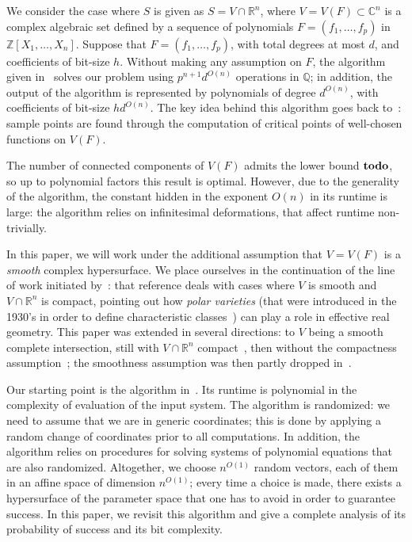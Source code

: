 \documentclass[a4paper]{article}
\newcommand{\ZZ}{{\mathbb{Z}}}
\def\C{\mathbb{C}}
\def\Q{\mathbb{Q}}
\def\R{\mathbb{R}}
\def\td{{\bf todo}}
\begin{document}
We consider the case where $S$ is given as $S=V \cap
\R^n$, where $V=V(F) \subset \C^n$ is a complex algebraic set defined
by a sequence of polynomials $F = (f_1,\hdots,f_p)$ in $\ZZ[X_1,\dots,X_n]$. Suppose that $F = (f_1,\hdots,f_p)$, with total degrees at most $d$, and coefficients of bit-size $h$. Without making any assumption on $F$, the algorithm given
in~\cite[Section~13.1]{BaPoRo03} solves our problem using $p^{n+1}d^{O(n)}$
operations in $\Q$; in addition, the output of the algorithm is
represented by polynomials of degree $d^{O(n)}$, with coefficients of
bit-size $hd^{O(n)}$.  The key idea behind this algorithm goes back
to~\cite{GrVo88}: sample points are found through the computation of
critical points of well-chosen functions on $V(F)$.


The number of connected components of $V(F)$ admits the lower bound $\td$, so up to polynomial factors this result is
optimal. However, due to the generality of the algorithm, the constant
hidden in the exponent $O(n)$ in its runtime is
large: the algorithm relies on infinitesimal deformations, that affect
runtime non-trivially.


In this paper, we will work under the additional assumption that
$V=V(F)$ is a {\em smooth} complex hypersurface. We place ourselves in
the continuation of the line of work initiated by~\cite{BaGiHeMb97}:
that reference deals with cases where $V$ is smooth and $V \cap \R^n$
is compact, pointing out how {\em polar varieties} (that were
introduced in the 1930's in order to define characteristic
classes~\cite{Piene78,Teissier88}) can play a role in effective real
geometry. This paper was extended in several directions: to $V$ being
a smooth complete intersection, still with $V\cap \R^n$
compact~\cite{BaGiHeMb01}, then without the compactness
assumption~\cite{EMP,BaGiHePa05}; the smoothness assumption was then partly
dropped in~\cite{BaGiHe14,BaGiHeLePa12}.



Our starting point is the algorithm in~\cite{EMP}. Its runtime is  polynomial in the
complexity of evaluation of the input system. The algorithm is randomized: we need to assume
that we are in generic coordinates; this is done by applying a random
change of coordinates prior to all computations. In addition, the
algorithm relies on procedures for solving systems of polynomial
equations that are also randomized.  Altogether, we choose
$n^{O(1)}$ random vectors, each of them in an affine space of
dimension $n^{O(1)}$; every time a choice is made, there exists a
hypersurface of the parameter space that one has to avoid in order to
guarantee success. In this paper, we revisit this algorithm and give a
complete analysis of its probability of success and its bit complexity.
\end{document}
